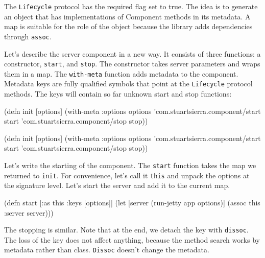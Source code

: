 The \verb|Lifecycle| protocol has the required flag set to true. The idea is to generate an object that has implementations of Component methods in its metadata. A map is suitable for the role of the object because the library adds dependencies through \verb|assoc|.

Let's describe the server component in a new way. It consists of three functions: a constructor, \verb|start|, and \verb|stop|. The constructor takes server parameters and wraps them in a map. The \verb|with-meta| function adds metadata to the component. Metadata keys are fully qualified symbols that point at the \verb|Lifecycle| protocol methods. The keys will contain so far unknown start and stop functions:

\ifnarrow

\begin{english}
  \begin{clojure}
(defn init [options]
  (with-meta {:options options}
    {'com.stuartsierra.component/start
     start
     'com.stuartsierra.component/stop
     stop}))
  \end{clojure}
\end{english}

\else

\begin{english}
  \begin{clojure}
(defn init [options]
  (with-meta {:options options}
    {'com.stuartsierra.component/start start
     'com.stuartsierra.component/stop stop}))
  \end{clojure}
\end{english}

\fi

Let's write the starting of the component. The \verb|start| function takes the map we returned to \verb|init|. For convenience, let's call it \verb|this| and unpack the options at the signature level. Let's start the server and add it to the current map.

\begin{english}
  \begin{clojure}
(defn start
  [{:as this :keys [options]}]
  (let [server (run-jetty app options)]
    (assoc this :server server)))
  \end{clojure}
\end{english}

The stopping is similar. Note that at the end, we detach the key with \verb|dissoc|. The loss of the key does not affect anything, because the method search works by metadata rather than class. \verb|Dissoc| doesn't change the metadata.

